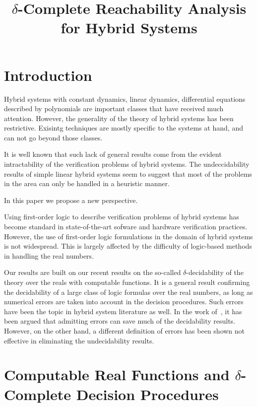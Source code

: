 \documentclass[envcountsect]{llncs}
\title{$\delta$-Complete Reachability Analysis for Hybrid Systems}
\institute{Carnegie Mellon University, Pittsburgh, PA 15213}
\begin{document}
\maketitle

\begin{abstract}
\end{abstract}

\section{Introduction}

Hybrid systems with constant dynamics, linear dynamics, differential equations described by polynomials are important classes that have received much attention. However, the generality of the theory of hybrid systems has been restrictive. Exisintg techniques are mostly specific to the systems at hand, and can not go beyond those classes. 

It is well known that such lack of general results come from the evident intractability of the verification problems of hybrid systems. The undeccidability results of simple linear hybrid systems seem to suggest that most of the problems in the area can only be handled in a heuristic manner. 

In this paper we propose a new perspective. 

Using first-order logic to describe verification problems of hybrid systems has become standard in state-of-the-art sofware and hardware verification practices. However, the use of first-order logic formulations in the domain of hybrid systems is not widespread. This is largely affected by the difficulty of logic-based methods in handling the real numbers. 

Our results are built on our recent results on the so-called $\delta$-decidability of the theory over the reals with computable functions. It is a general result confirming the decidability of a large class of logic formulas over the real numbers, as long as numerical errors are taken into account in the decision procedures. Such errors have been the topic in hybrid system literature as well. In the work of~\cite{}, it has been argued that admitting errors can save much of the decidability results. However, on the other hand, a different definition of errors has been shown not effective in eliminating the undecidability results. 

  


\section{Computable Real Functions and $\delta$-Complete Decision Procedures}
\end{document}
